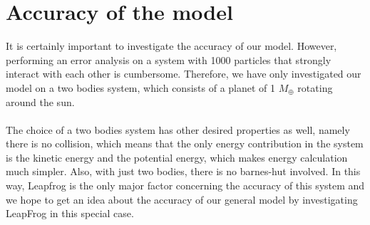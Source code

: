 \section{Accuracy of the model}
It is certainly important to investigate the accuracy of our model. 
However, performing an error analysis on a system with 1000 particles that strongly interact with each other is cumbersome. 
Therefore, we have only investigated our model on a two bodies system, which consists of a planet of 1 $M_{\oplus}$ rotating around the sun.\\
\\
The choice of a two bodies system has other desired properties as well, namely there is no collision, which means that the only energy contribution in the system is the kinetic energy and the potential energy, which makes energy calculation much simpler. Also, with just two bodies, there is no barnes-hut involved. In this way, Leapfrog is the only major factor concerning the accuracy of this system and we hope to get an idea about the accuracy of our general model by investigating LeapFrog in this special case.

